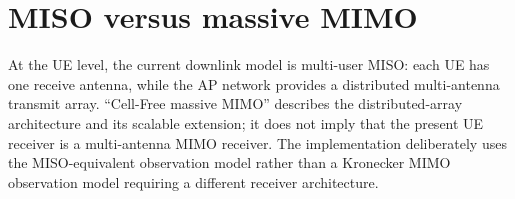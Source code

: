 \section{MISO versus massive MIMO}
At the UE level, the current downlink model is multi-user MISO: each UE has one
receive antenna, while the AP network provides a distributed multi-antenna
transmit array. ``Cell-Free massive MIMO'' describes the distributed-array
architecture and its scalable extension; it does not imply that the present
UE receiver is a multi-antenna MIMO receiver. The implementation deliberately
uses the MISO-equivalent observation model rather than a Kronecker MIMO
observation model requiring a different receiver architecture.

